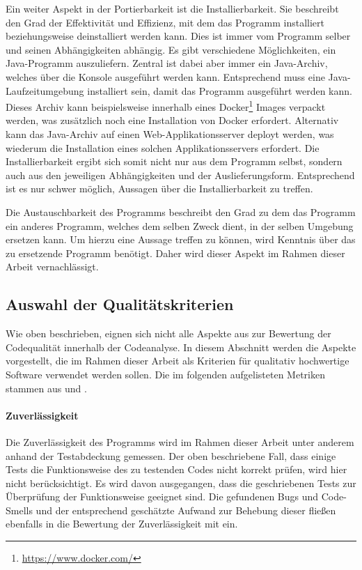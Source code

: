 \documentclass[
	oneside,  %
	ngerman, 
	final, 
	11pt, 
	a4paper, 
	1.1headlines, 
	headinclude=false, 
	footinclude=false, 
	mpinclude=false, 
	pagesize, 
	onecolumn, 
	titlepage, 
	parskip=half, 
	headsepline, 
	chapterprefix=false, 
	version=first, 
	listof=totoc, 
	bibliography=totoc, 
	toc=graduated, 
	fleqn
]{scrbook}
\begin{document}
Ein weiter Aspekt in der Portierbarkeit ist die Installierbarkeit.
Sie beschreibt den Grad der Effektivität und Effizienz, mit dem das Programm installiert beziehungsweise deinstalliert werden kann.
Dies ist immer vom Programm selber und seinen Abhängigkeiten abhängig.
Es gibt verschiedene Möglichkeiten, ein Java-Programm auszuliefern.
Zentral ist dabei aber immer ein Java-Archiv, welches über die Konsole ausgeführt werden kann.
Entsprechend muss eine Java-Laufzeitumgebung installiert sein, damit das Programm ausgeführt werden kann.
Dieses Archiv kann beispielsweise innerhalb eines Docker\footnote{\url{https://www.docker.com/}} Images verpackt werden, was zusätzlich noch eine Installation von Docker erfordert.
Alternativ kann das Java-Archiv auf einen Web-Applikationsserver deployt werden, was wiederum die Installation eines solchen Applikationsservers erfordert.
Die Installierbarkeit ergibt sich somit nicht nur aus dem Programm selbst, sondern auch aus den jeweiligen Abhängigkeiten und der Auslieferungsform.
Entsprechend ist es nur schwer möglich, Aussagen über die Installierbarkeit zu treffen.

Die Austauschbarkeit des Programms beschreibt den Grad zu dem das Programm ein anderes Programm, welches dem selben Zweck dient, in der selben Umgebung ersetzen kann.
Um hierzu eine Aussage treffen zu können, wird Kenntnis über das zu ersetzende Programm benötigt.
Daher wird dieser Aspekt im Rahmen dieser Arbeit vernachlässigt.

\subsection{Auswahl der Qualitätskriterien}
\label{Auswahl_Kriterien}
Wie oben beschrieben, eignen sich nicht alle Aspekte aus \cite{ISO-25010} zur Bewertung der Codequalität innerhalb der Codeanalyse.
In diesem Abschnitt werden die Aspekte vorgestellt, die im Rahmen dieser Arbeit als Kriterien für qualitativ hochwertige Software verwendet werden sollen.
Die im folgenden aufgelisteten Metriken stammen aus \cite{Ch2021} und \cite{So2021}.

\paragraph{Zuverlässigkeit}
Die Zuverlässigkeit des Programms wird im Rahmen dieser Arbeit unter anderem anhand der Testabdeckung gemessen.
Der oben beschriebene Fall, dass einige Tests die Funktionsweise des zu testenden Codes nicht korrekt prüfen, wird hier nicht berücksichtigt.
Es wird davon ausgegangen, dass die geschriebenen Tests zur Überprüfung der Funktionsweise geeignet sind.
Die gefundenen Bugs und Code-Smells und der entsprechend geschätzte Aufwand zur Behebung dieser fließen ebenfalls in die Bewertung der Zuverlässigkeit mit ein.
\end{document}
